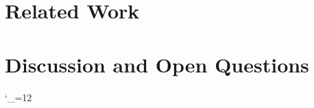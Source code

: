 \documentclass[11pt]{article}
\begin{document}
\section{Related Work}\label{sec:related}

\FloatBarrier

\section{Discussion and Open Questions}\label{sec:discussion}

\FloatBarrier

\FloatBarrier
\clearpage
\appendix


\clearpage
\begingroup
\catcode`\_=12


\endgroup
\end{document}
